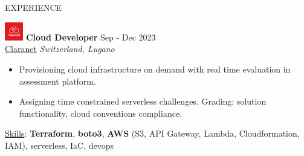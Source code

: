 \documentclass{resume} %
\def\intraexpvspace{0.15cm}
\def\titlelistvspace{-0.15cm}
\begin{document}
\vspace{-0.2cm}
\begin{rSection}{EXPERIENCE}

    \includegraphics[width=0.8cm, trim={0cm 1.9cm 0cm 0cm}]{claranet-icon.png}
    \textbf{Cloud Developer} \hfill Sep - Dec 2023\\
    \hspace*{0.9cm}\href{https://www.claranet.com/}{Claranet}
    \hfill \textit{Switzerland, Lugano}
    \vspace{\titlelistvspace}\begin{itemize}
        \itemsep -3pt {}
        \item Provisioning cloud infrastructure on demand
              with real time evaluation in assessment platform.
        \item Assigning time constrained serverless challenges.
              Grading: solution functionality, cloud conventions compliance.
    \end{itemize}
    \vspace*{-0.1cm}\hspace*{0.5cm}\underline{Skills}: \textbf{Terraform},
    \textbf{boto3},
    \textbf{AWS} (S3, API Gateway, Lambda, Cloudformation, IAM), %
    serverless,
    IaC,
    devops
    \vspace{\intraexpvspace}


\end{rSection}
\end{document}
